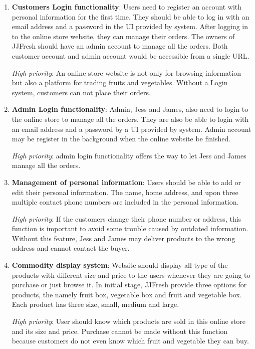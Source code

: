 \documentclass{report}
\begin{document}
\begin{enumerate}
  \item \textbf{Customers Login functionality}: Users need to register an account with personal information for the first time. They should be able to log in with an email address and a password in the UI provided by system. After logging in to the online store website, they can manage their orders. The owners of JJFresh should have an admin account to manage all the orders. Both customer account and admin account would be accessible from a single URL.

  \textit{High priority}: An online store website is not only for browsing information but also a platform for trading fruits and vegetables. Without a Login system, customers can not place their orders.
  
  \item \textbf{Admin Login functionality}: Admin, Jess and James, also need to login to the online store to manage all the orders. They are also be able to login with an email address and a password by a UI provided by system. Admin account may be register in the background when the online website be finished.

  \textit{High priority}: admin login functionality offers the way to let Jess and James manage all the orders.

  \item \textbf{Management of personal information}: Users should be able to add or edit their personal information. The name, home address, and upon three multiple contact phone numbers are included in the personal information.

  \textit{High priority}: If the customers change their phone number or address, this function is important to avoid some trouble caused by outdated information. Without this feature, Jess and James may deliver products to the wrong address and cannot contact the buyer.

  \item \textbf{Commodity display system}: Website should display all type of the products with different size and price to the users whenever they are going to purchase or just browse it. In initial stage, JJFresh provide three options for products, the namely fruit box, vegetable box and fruit and vegetable box. Each product has three size, small, medium and large.

  \textit{High priority}: User should know which products are sold in this online store and its size and price. Purchase cannot be made without this function because customers do not even know which fruit and vegetable they can buy.
  

\end{enumerate}
\end{document}
